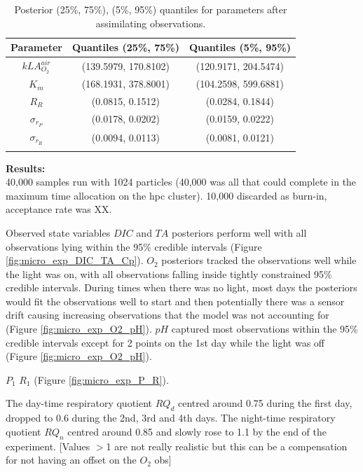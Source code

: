 \documentclass{ruthesis}
\begin{document}
\begin{longtable}{|c|c|c|} 
	\hline
	\bfseries{Parameter}  & \bfseries{Quantiles (25\%, 75\%)}  & \bfseries{Quantiles (5\%, 95\%)} \\ \hline
	$kLA_{O_2}^{air}$ 	& (139.5979, 170.8102)  & (120.9171, 204.5474)   \\
	$K_m$ 				& (168.1931, 378.8001) 	& (104.2598, 599.6881) 	 \\ 
	$R_R$ 				& (0.0815, 0.1512) 		& (0.0284, 0.1844) 		 \\
	$\sigma_{r_P}$ 		& (0.0178, 0.0202) 		& (0.0159, 0.0222) 		 \\ 
	$\sigma_{r_R}$ 		& (0.0094, 0.0113) 		& (0.0081, 0.0121)		 \\ 
	
	\hline
	\caption[.]{Posterior (25\%, 75\%), (5\%, 95\%) quantiles for parameters after assimilating observations.}	
	\label{table:micro_exp_parameters_table}
\end{longtable}

\textbf{Results:}\\
40,000 samples run with 1024 particles (40,000 was all that could complete in the maximum time allocation on the hpc cluster). 10,000 discarded as burn-in, acceptance rate was XX.

Observed state variables $DIC$ and $TA$ posteriors perform well with all observations lying within the 95\% credible intervals (Figure \ref{fig:micro_exp_DIC_TA_Cp}). $O_2$ posteriors tracked the observations well while the light was on, with all observations falling inside tightly constrained 95\% credible intervals. During times when there was no light, most days the posteriors would fit the observations well to start and then potentially there was a sensor drift causing increasing observations that the model was not accounting for (Figure \ref{fig:micro_exp_O2_pH}). $pH$ captured most observations within the 95\% credible intervals except for 2 points on the 1st day while the light was off (Figure \ref{fig:micro_exp_O2_pH}).
 

$P_1$
$R_1$
(Figure \ref{fig:micro_exp_P_R}).

The day-time respiratory quotient $RQ_d$ centred around 0.75 during the first day, dropped to 0.6 during the 2nd, 3rd and 4th days. The night-time respiratory quotient $RQ_n$ centred around 0.85 and slowly rose to 1.1 by the end of the experiment. [Values $>$1 are not really realistic but this can be a compensation for not having an offset on the $O_2$ obs]
\end{document}
